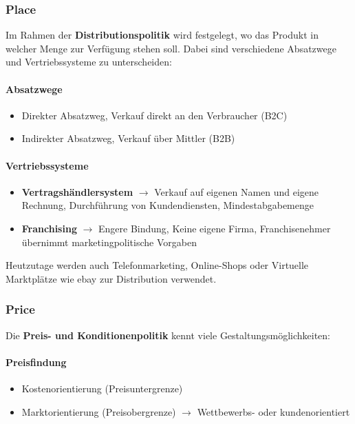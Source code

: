 \documentclass[titlepage,parskip=half]{scrartcl}
\begin{document}
\subsubsection{Place}
Im Rahmen der \textbf{Distributionspolitik} wird festgelegt, wo das Produkt in welcher Menge zur Verfügung stehen soll. Dabei sind verschiedene Absatzwege und Vertriebssysteme zu unterscheiden:

\paragraph{Absatzwege}
\begin{itemize}
    \item Direkter Absatzweg, Verkauf direkt an den Verbraucher (B2C)
    \item Indirekter Absatzweg, Verkauf über Mittler (B2B)
\end{itemize}

\paragraph{Vertriebssysteme}
\begin{itemize}
    \item \textbf{Vertragshändlersystem} $\rightarrow$ Verkauf auf eigenen Namen und eigene Rechnung, Durch\-füh\-rung von Kundendiensten, Mindestabgabemenge
    \item \textbf{Franchising} $\rightarrow$ Engere Bindung, Keine eigene Firma, Franchisenehmer übernimmt marketingpolitische Vorgaben
\end{itemize}

Heutzutage werden auch Telefonmarketing, Online-Shops oder Virtuelle Marktplätze wie ebay zur Distribution verwendet.

\subsubsection{Price}
Die \textbf{Preis- und Konditionenpolitik} kennt viele Gestaltungsmöglichkeiten:

\paragraph{Preisfindung}
\begin{itemize}
    \item Kostenorientierung (Preisuntergrenze)
    \item Marktorientierung (Preisobergrenze) $\rightarrow$ Wettbewerbs- oder kundenorientiert
\end{itemize}
\end{document}
